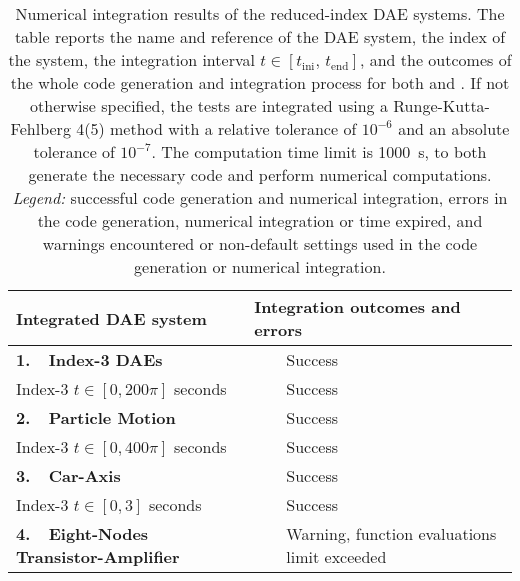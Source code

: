 \setlength\tabcolsep{2.5pt}
\setlength{\LTcapwidth}{\textwidth}
{\footnotesize\centering\begin{longtable}{lccl}
  \caption[
    Numerical integration results of the reduced-index \ac{DAE} systems.
  ]{
    Numerical integration results of the reduced-index \ac{DAE} systems. The table reports the name and reference of the \ac{DAE} system, the index of the system, the integration interval $t \in [t_{\text{ini}}, \, t_{\text{end}}]$, and the outcomes of the whole code generation and integration process for both \Maple{} and \Indigo{}. If not otherwise specified, the tests are integrated using a Runge-Kutta-Fehlberg 4(5) method with a relative tolerance of $10^{-6}$ and an absolute tolerance of $10^{-7}$. The computation time limit is \SI{1000}{\second}, to both generate the necessary code and perform numerical computations. \emph{Legend:} \mycheckmark{} successful code generation and numerical integration, \mycrossmark{} errors in the code generation, numerical integration or time expired, and \mywarnmark{} warnings encountered or non-default settings used in the code generation or numerical integration.
  }
  \label{chap3:tab:numerical_integration}
  \endfirsthead
  \endhead
  \toprule
  \textbf{Integrated \ac{DAE} system} &
  \multicolumn{3}{l}{\textbf{Integration outcomes and errors}} \\
  \midrule
  \multirow{1}{*}{\textbf{1.~~Index-3 \acp{DAE}~\cite{mathematica}}}
    & \Maple{}  & \mycheckmark{}\phantom{\mywarnmark{}} & Success \\ \cmidrule(l{4pt}){2-4}
    Index-3 \quad $t \in [0, 200\pi]$ seconds & \Indigo{} & \mycheckmark{}\phantom{\mywarnmark{}} & Success \\ \midrule
  \multirow{1}{*}{\textbf{2.~~Particle Motion~\cite{campbell1995index}}}
    & \Maple{}  & \mycheckmark{}\phantom{\mywarnmark{}} & Success \\ \cmidrule(l{4pt}){2-4}
    Index-3 \quad $t \in [0, 400\pi]$ seconds & \Indigo{} & \mycheckmark{}\phantom{\mywarnmark{}} & Success \\ \midrule
  \multirow{1}{*}{\textbf{3.~~Car-Axis~\cite{lioen1998test, mazzia2008test}}}
    & \Maple{}  & \mycheckmark{}\phantom{\mywarnmark{}} & Success \\ \cmidrule(l{4pt}){2-4}
    Index-3 \quad $t \in [0, 3]$ seconds & \Indigo{} & \mycheckmark{}\phantom{\mywarnmark{}} & Success \\ \midrule
  \multirow{1}{*}{\textbf{4.~~Eight-Nodes Transistor-Amplifier~\cite{lioen1998test, mazzia2008test}}}
    & \Maple{}  & \mycheckmark{}\mywarnmark{} & Warning, function evaluations limit exceeded \\ \cmidrule(l{4pt}){2-4}

\end{longtable}}
